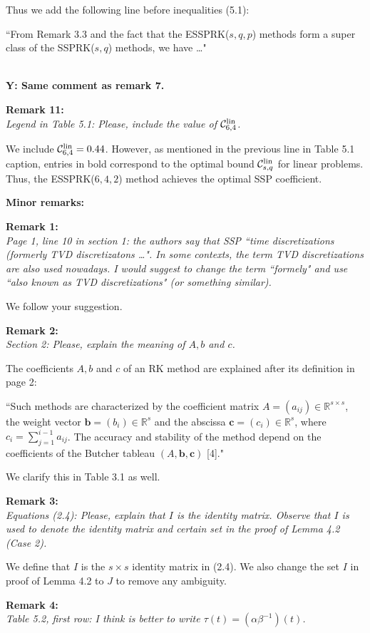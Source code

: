 \documentclass[12pt]{article}
\newcommand{\remark}[2]{\vspace{25pt} \noindent \textbf{Remark #1:\newline} \textit{#2}\vspace{15pt}}
\renewcommand{\newline}{\vspace{15pt}\\}
\newcommand{\sspcoef}{\mathcal{C}}
\newcommand{\clin}{\sspcoef^{\textnormal{lin}}_{s,q}}
\newcommand{\yiannis}[1]{\textcolor{OliveGreen}{\\\textbf{Y: \footnotesize #1}\\}}
\begin{document}
Thus we add the following line before inequalities (5.1):

``From Remark 3.3 and the fact that the ESSPRK($s,q,p$) methods 
form a super class of the SSPRK($s,q$) methods, we have \dots"

\yiannis{Same comment as remark 7.}

\remark{11}{
Legend in Table 5.1: Please, include the value of $\sspcoef^{\textnormal{lin}}_{6,4}$.}

We include $\sspcoef^{\textnormal{lin}}_{6,4}=0.44$.
However, as mentioned in the previous line in Table 5.1 caption, entries in bold correspond to 
the optimal bound $\clin$ for linear problems. Thus, the ESSPRK($6,4,2$) method achieves the 
optimal SSP coefficient.
\vspace{20pt}

\noindent \textbf{\large Minor remarks:}

\remark{1}{
Page 1, line 10 in section 1: the authors say that SSP ``time discretizations (formerly
TVD discretizatons \dots". 
In some contexts, the term TVD discretizations are also used nowadays. 
I would suggest to change the term ``formely" and use ``also known as TVD discretizations" 
(or something similar).}

We follow your suggestion.

\remark{2}{
Section 2: Please, explain the meaning of $A, b$ and $c$.}

The coefficients $A, b$ and $c$ of an RK method are explained after its definition in page 2:

``Such methods are characterized by the coefficient matrix $A = (a_{ij}) \in 
\mathbb{R}^{s \times s}$, the weight vector $\bm{b} = (b_i) \in \mathbb{R}^s$
and the abscissa $\bm{c} = (c_i) \in \mathbb{R}^s$, where 
$c_i = \sum_{j=1}^{i-1}a_{ij}$.
The accuracy and stability of the method depend on the coefficients of the 
Butcher tableau $(A,\bm{b},\bm{c})$ [4]."

We clarify this in Table 3.1 as well.

\remark{3}{
Equations (2.4): Please, explain that $I$ is the identity matrix. Observe that $I$ is used to
denote the identity matrix and certain set in the proof of Lemma 4.2 (Case 2).}

We define that $I$ is the $s \times s$ identity matrix in (2.4).
We also change the set $I$ in proof of Lemma 4.2 to $J$ to remove any ambiguity.

\remark{4}{
Table 5.2, first row: I think is better to write $\tau(t) = (\alpha\beta^{-1})(t)$.}
\end{document}
